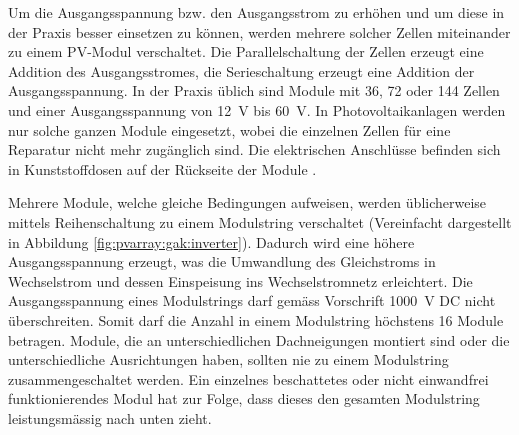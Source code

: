 Um die  Ausgangsspannung bzw. den Ausgangsstrom  zu erh\"ohen und um  diese in
der  Praxis  besser  einsetzen  zu k\"onnen,  werden  mehrere  solcher  Zellen
miteinander zu  einem PV-Modul  verschaltet. Die Parallelschaltung  der Zellen
erzeugt  eine Addition  des Ausgangsstromes,  die Serieschaltung  erzeugt eine
Addition  der  Ausgangsspannung. In  der   Praxis  \"ublich  sind  Module  mit
36,  72  oder  144  Zellen   und  einer  Ausgangsspannung  von  \SI{12}{\volt}
bis  \SI{60}{\volt}. In Photovoltaikanlagen  werden nur  solche ganzen  Module
eingesetzt,   wobei  die   einzelnen   Zellen  f\"ur   eine  Reparatur   nicht
mehr  zug\"anglich  sind. Die  elektrischen   Anschl\"usse  befinden  sich  in
Kunststoffdosen auf der R\"uckseite der Module \cite{ref:pv:baunetz}.


Mehrere Module,  welche gleiche Bedingungen aufweisen,  werden \"ublicherweise
mittels   Reihenschaltung  zu   einem  Modulstring   verschaltet  (Vereinfacht
dargestellt   in   Abbildung   \ref{fig:pvarray:gak:inverter}). Dadurch   wird
eine   h\"ohere    Ausgangsspannung   erzeugt,   was   die    Umwandlung   des
Gleichstroms  in  Wechselstrom  und dessen  Einspeisung  ins  Wechselstromnetz
erleichtert. Die Ausgangsspannung eines  Modulstrings darf gem\"ass Vorschrift
\SI{1000}{\volt}   DC  nicht   \"uberschreiten. Somit  darf   die  Anzahl   in
einem  Modulstring  h\"ochstens  16  Module  betragen. Module,   die   an  unterschiedlichen   Dachneigungen
montiert sind  oder die unterschiedliche  Ausrichtungen haben, sollten  nie zu
einem Modulstring  zusammengeschaltet werden. Ein einzelnes  beschattetes oder
nicht  einwandfrei  funktionierendes Modul  hat  zur  Folge, dass  dieses  den
gesamten Modulstring leistungsm\"assig nach unten zieht.

